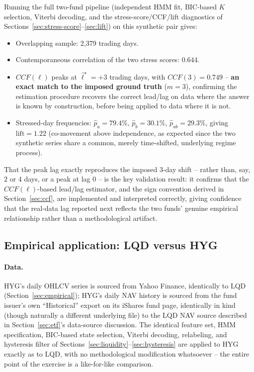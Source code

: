 \documentclass[11pt]{article}
\theoremstyle{definition}
\theoremstyle{remark}
\begin{document}
Running the full two-fund pipeline (independent HMM fit, BIC-based $K$ selection, Viterbi decoding, and the stress-score/CCF/lift diagnostics of Sections~\ref{sec:stress-score}--\ref{sec:lift}) on this synthetic pair gives:
\begin{itemize}
    \item Overlapping sample: 2{,}379 trading days.
    \item Contemporaneous correlation of the two stress scores: $0.644$.
    \item $CCF(\ell)$ peaks at $\widehat\ell^\star=+3$ trading days, with $CCF(3)=0.749$ -- \textbf{an exact match to the imposed ground truth} ($m=3$), confirming the estimation procedure recovers the correct lead/lag on data where the answer is known by construction, before being applied to data where it is not.
    \item Stressed-day frequencies: $\widehat p_a=79.4\%$, $\widehat p_b=30.1\%$, $\widehat p_{ab}=29.3\%$, giving $\mathrm{lift}=1.22$ (co-movement above independence, as expected since the two synthetic series share a common, merely time-shifted, underlying regime process).
\end{itemize}
That the peak lag exactly reproduces the imposed 3-day shift -- rather than, say, $2$ or $4$ days, or a peak at lag $0$ -- is the key validation result: it confirms that the $CCF(\ell)$-based lead/lag estimator, and the sign convention derived in Section~\ref{sec:ccf}, are implemented and interpreted correctly, giving confidence that the real-data lag reported next reflects the two funds' genuine empirical relationship rather than a methodological artifact.

\subsection{Empirical application: LQD versus HYG}
\label{sec:crossetf-real}

\paragraph{Data.} HYG's daily OHLCV series is sourced from Yahoo Finance, identically to LQD (Section~\ref{sec:empirical}); HYG's daily NAV history is sourced from the fund issuer's own ``Historical'' export on its iShares fund page, identically in kind (though naturally a different underlying file) to the LQD NAV source described in Section~\ref{sec:etf}'s data-source discussion. The identical feature set, HMM specification, BIC-based state selection, Viterbi decoding, relabeling, and hysteresis filter of Sections~\ref{sec:liquidity}--\ref{sec:hysteresis} are applied to HYG exactly as to LQD, with no methodological modification whatsoever -- the entire point of the exercise is a like-for-like comparison.
\end{document}

